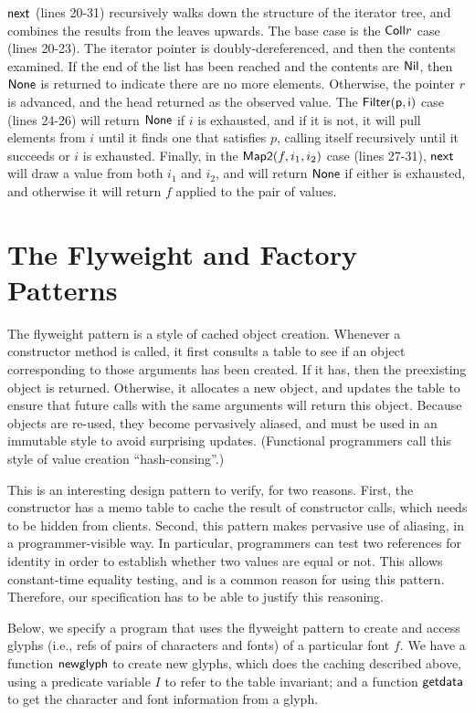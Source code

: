 $\mathsf{next}$ (lines 20-31) recursively walks down the structure of
the iterator tree, and combines the results from the leaves upwards.
The base case is the $\mathsf{Coll }r$ case (lines 20-23). The iterator
pointer is doubly-dereferenced, and then the contents examined. If the
end of the list has been reached and the contents are $\mathsf{Nil}$,
then $\mathsf{None}$ is returned to indicate there are no more
elements. Otherwise, the pointer $r$ is advanced, and the head
returned as the observed value. The $\mathsf{Filter(p,i)}$ case (lines
24-26) will return $\mathsf{None}$ if $i$ is exhausted, and if it is
not, it will pull elements from $i$ until it finds one that satisfies
$p$, calling itself recursively until it succeeds or $i$ is exhausted.
Finally, in the $\mathsf{Map2}(f, i_1, i_2)$ case (lines 27-31),
$\mathsf{next}$ will draw a value from both $i_1$ and $i_2$, and will
return $\mathsf{None}$ if either is exhausted, and otherwise it will
return $f$ applied to the pair of values.


\section{The Flyweight and Factory Patterns}

The flyweight pattern is a style of cached object creation. Whenever a
constructor method is called, it first consults a table to see if an
object corresponding to those arguments has been created. If it has,
then the preexisting object is returned.  Otherwise, it allocates a
new object, and updates the table to ensure that future calls with the
same arguments will return this object. Because objects are re-used,
they become pervasively aliased, and must be used in an immutable
style to avoid surprising updates. (Functional programmers call this
style of value creation ``hash-consing''.)

This is an interesting design pattern to verify, for two reasons.
First, the constructor has a memo table to cache the result of
constructor calls, which needs to be hidden from clients. Second, this
pattern makes pervasive use of aliasing, in a programmer-visible
way. In particular, programmers can test two references for identity
in order to establish whether two values are equal or not. This allows
constant-time equality testing, and is a common reason for using this
pattern. Therefore, our specification has to be able to justify this
reasoning.

Below, we specify a program that uses the flyweight pattern to create
and access glyphs (i.e., refs of pairs of characters and fonts) of a
particular font $f$. We have a function $\mathsf{newglyph}$ to create
new glyphs, which does the caching described above, using a predicate
variable $I$ to refer to the table invariant; and a function
$\mathsf{getdata}$ to get the character and font information from a
glyph.

